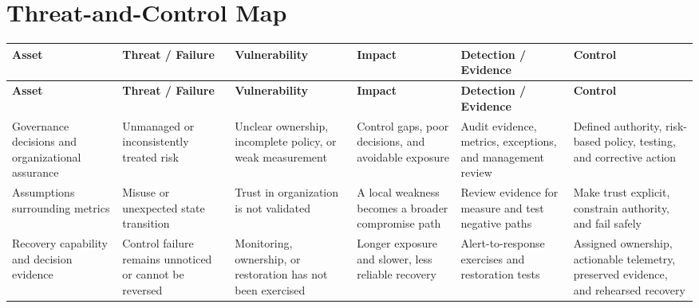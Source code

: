 \documentclass[11pt,letterpaper]{article}
\begin{document}
\section*{Threat-and-Control Map}
\begingroup\scriptsize\setlength{\tabcolsep}{2pt}
\begin{longtable}{>{\raggedright\arraybackslash}p{}>{\raggedright\arraybackslash}p{}>{\raggedright\arraybackslash}p{}>{\raggedright\arraybackslash}p{}>{\raggedright\arraybackslash}p{}>{\raggedright\arraybackslash}p{}}
\toprule\rowcolor{Navy}\color{white}\textbf{Asset} & \color{white}\textbf{Threat / Failure} & \color{white}\textbf{Vulnerability} & \color{white}\textbf{Impact} & \color{white}\textbf{Detection / Evidence} & \color{white}\textbf{Control}\\\midrule
\endfirsthead
\toprule\rowcolor{Navy}\color{white}\textbf{Asset} & \color{white}\textbf{Threat / Failure} & \color{white}\textbf{Vulnerability} & \color{white}\textbf{Impact} & \color{white}\textbf{Detection / Evidence} & \color{white}\textbf{Control}\\\midrule
\endhead
Governance decisions and organizational assurance & Unmanaged or inconsistently treated risk & Unclear ownership, incomplete policy, or weak measurement & Control gaps, poor decisions, and avoidable exposure & Audit evidence, metrics, exceptions, and management review & Defined authority, risk-based policy, testing, and corrective action\\\midrule
Assumptions surrounding metrics & Misuse or unexpected state transition & Trust in organization is not validated & A local weakness becomes a broader compromise path & Review evidence for measure and test negative paths & Make trust explicit, constrain authority, and fail safely\\\midrule
Recovery capability and decision evidence & Control failure remains unnoticed or cannot be reversed & Monitoring, ownership, or restoration has not been exercised & Longer exposure and slower, less reliable recovery & Alert-to-response exercises and restoration tests & Assigned ownership, actionable telemetry, preserved evidence, and rehearsed recovery\\\midrule
\bottomrule
\end{longtable}
\endgroup
\end{document}
